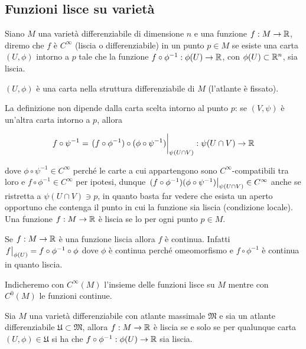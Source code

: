 \subsection{Funzioni lisce su varietà}

Siano $ M $ una varietà differenziabile di dimensione $ n $ e una funzione $ f : M \to \mathbb{R} $, diremo che $ f $ è $ C^{\infty} $ (liscia o differenziabile) in un punto $ p \in M $ se esiste una carta $ (U,\phi) $ intorno a $ p $ tale che la funzione $ f \circ \phi^{-1} : \phi(U) \to \mathbb{R} $, con $ \phi(U) \subset \mathbb{R}^{n} $, sia liscia.


\begin{remark}
	$ (U,\phi) $ è una carta nella struttura differenziabile di $ M $ (l'atlante è fissato).
\end{remark}

La definizione non dipende dalla carta scelta intorno al punto $ p $: se $ (V,\psi) $ è un'altra carta intorno a $ p $, allora

\begin{equation}
	f \circ \psi^{-1} = \eval{ (f \circ \phi^{-1}) \circ (\phi \circ \psi^{-1}) }_{\psi(U \cap V)} : \psi(U \cap V) \to \R
\end{equation}

dove $ \phi \circ \psi^{-1} \in C^{\infty} $ perché le carte a cui appartengono sono $ C^{\infty} $-compatibili tra loro e $ f \circ \phi^{-1} \in C^{\infty} $ per ipotesi, dunque $ \eval{ (f \circ \phi^{-1})(\phi \circ \psi^{-1}) }_{\psi(U \cap V)} \in C^{\infty} $ anche se ristretta a $ \psi(U \cap V) \ni p $, in quanto basta far vedere che esista un aperto opportuno che contenga il punto in cui la funzione sia liscia (condizione locale).\\
Una funzione $ f : M \to \mathbb{R} $ è liscia se lo per ogni punto $ p \in M $.

\begin{remark}
	Se $ f : M \to \mathbb{R} $ è una funzione liscia allora $ f $ è continua. Infatti $ \eval{f}_{\phi(U)} = f \circ \phi^{-1} \circ \phi $ dove $ \phi $ è continua perché omeomorfismo e $ f \circ \phi^{-1} $ è continua in quanto liscia.
\end{remark}

Indicheremo con $ C^{\infty}(M) $ l'insieme delle funzioni lisce su $ M $ mentre con $ C^{0}(M) $ le funzioni continue.

\begin{definition}
	Sia $ M $ una varietà differenziabile con atlante massimale $ \mathfrak{M} $ e sia un atlante differenziabile $ \mathfrak{U} \subset \mathfrak{M} $, allora $ f : M \to \mathbb{R} $ è liscia se e solo se per qualunque carta $ (U,\phi) \in \mathfrak{U} $ si ha che $ f \circ \phi^{-1} : \phi(U) \to \mathbb{R} $ sia liscia.
\end{definition}

